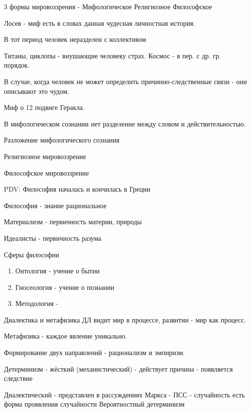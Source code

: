 \documentclass[a4paper,12pt]{report}
\begin{document}
	3 формы мировоззрения -
		Мифологическое
		Религиозное
		Философское


	Лосев - миф есть в словах данная чудесная личностная история.

	В тот период человек неразделен с коллективом

	Титаны, циклопы - внушающие человеку страх.
	Космос - в пер. с др. гр. порядок.

	В случае, когда человек не может определить причинно-следственные связи - они описывают это чудом.

		Миф о 12 подвиге Геракла.

		В мифологическом сознании нет разделение между словом и действительностью.



	Разложение мифологического сознания









	Религиозное мировоззрение









	Философское мировоззрение

	PDV: Философия началась и кончилась в Греции

	Философия - знание рациональное

	Материализм - первичность материи, природы

	Идеалисты - первичность разума

	Сферы философии
	\begin{enumerate}
		\item	Онтология - учение о бытии
		\item	Гносеология - учение о познании
		\item	Методология -
	\end{enumerate}

	Диалектика и метафизика
	ДЛ видит мир в процессе, развитии - мир как процесс.

	Метафизика - каждое явление уникально.

	Формирование двух направлений - рационализм и эмпиризм.


	Детерминизм - жёсткий (механистический)  - действует причина - появляется следствие

	Диалектический  - представлен в рассуждениях Маркса - ПСС - случайность есть форма проявления случайности
	Вероятностный детерминизм
\end{document}
